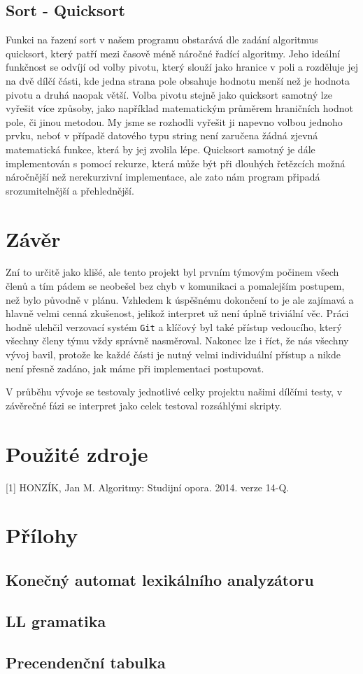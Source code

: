 ﻿\documentclass[12pt]{article}
\begin{document}
\newpage

\subsection{Sort - Quicksort}

Funkci na řazení sort v našem programu obstarává dle zadání algoritmus quicksort, který patří mezi časově méně náročné řadící algoritmy. Jeho ideální funkčnost se odvíjí od volby pivotu, který slouží jako hranice v poli a rozděluje jej na dvě dílčí části, kde jedna strana pole obsahuje hodnotu menší než je hodnota pivotu a druhá naopak větší. Volba pivotu stejně jako quicksort samotný lze vyřešit více způsoby, jako například matematickým průměrem hraničních hodnot pole, či jinou metodou. My jsme se rozhodli vyřešit ji napevno volbou jednoho prvku, neboť v případě datového typu string není zaručena žádná zjevná matematická funkce, která by jej zvolila lépe. Quicksort samotný je dále implementován s pomocí rekurze, která může být při dlouhých řetězcích možná náročnější než nerekurzivní implementace, ale zato nám program připadá srozumitelnější a přehlednější.





\section{Závěr}

Zní to určitě jako klišé, ale tento projekt byl prvním týmovým počinem všech členů a tím pádem se neobešel bez chyb v komunikaci a pomalejším postupem, než bylo původně v plánu. Vzhledem k úspěšnému dokončení to je ale zajímavá a hlavně velmi cenná zkušenost, jelikož interpret už není úplně triviální věc. Práci hodně ulehčil verzovací systém \verb|Git| a klíčový byl také přístup vedoucího, který všechny členy týmu vždy správně nasměroval. Nakonec lze i říct, že nás všechny vývoj bavil, protože ke každé části je nutný velmi individuální přístup a nikde není přesně zadáno, jak máme při implementaci postupovat.

V průběhu vývoje se testovaly jednotlivé celky projektu našimi dílčími testy, v závěrečné fázi se interpret jako celek testoval rozsáhlými skripty.

\section{Použité zdroje}

[1] HONZÍK, Jan M. Algoritmy: Studijní opora. 2014. verze 14-Q.

\newpage
\section{Přílohy}
\subsection{Konečný automat lexikálního analyzátoru}\label{automat}

\newpage
\subsection{LL gramatika}\label{ll}

\vspace{15cm}

\subsection{Precendenční tabulka}\label{tabulka}
\end{document}
